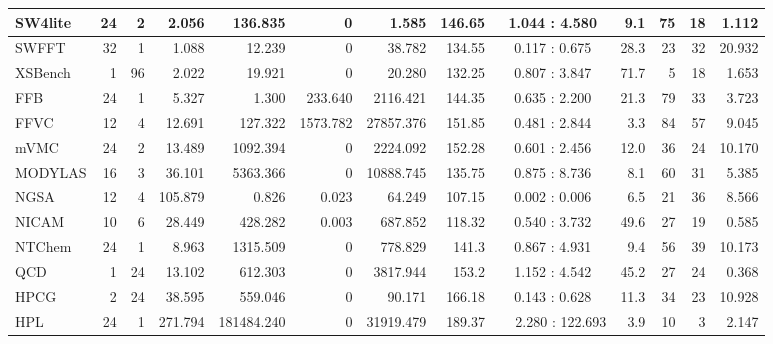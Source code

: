 \begin{table*}[tbp]
\begin{tabular}{|l|r|r|r|r|r|r|r|c|r|r|r|r|}
        SW4lite	    &	24	&	2	&	2.056	&	136.835	&	0	&	1.585	&	146.65	&	1.044 : 4.580	&	9.1		&	75		&    18	&	1.112	\\ \hline
        SWFFT	    &	32	&	1	&	1.088	&	12.239	&	0	&	38.782	&	134.55	&	0.117 : 0.675	&	28.3	&	23		&    32	&	20.932	\\ \hline \rC
        XSBench	    &	1	&	96	&	2.022	&	19.921	&	0	&	20.280	&	132.25	&	0.807 : 3.847	&	71.7	&	5		&    18	&	1.653	\\ \hline\hline
        FFB	        &	24	&	1	&	5.327	&	1.300	&	233.640	&	2116.421	&	144.35	&	0.635 : 2.200	&	21.3	&	79		&    33	&	3.723	\\ \hline \rC
        FFVC	    &	12	&	4	&	12.691	&	127.322	&	1573.782	&	27857.376	&	151.85	&	0.481 : 2.844	&	3.3		&	84		&    57	&	9.045	\\ \hline
        mVMC	    &	24	&	2	&	13.489	&	1092.394	&	0	&	2224.092	&	152.28	&	0.601 : 2.456	&	12.0	&	36		&    24	&	10.170	\\ \hline \rC
        MODYLAS	    &	16	&	3	&	36.101	&	5363.366	&	0	&	10888.745	&	135.75	&	0.875 : 8.736	&	8.1		&	60		&    31	&	5.385	\\ \hline
        NGSA	    &	12	&	4	&	105.879	&	0.826	&	0.023	&	64.249	&	107.15	&	0.002 : 0.006	&	6.5		&	21		&    36	&	8.566	\\ \hline \rC
        NICAM	    &	10	&	6	&	28.449	&	428.282	&	0.003	&	687.852	&	118.32	&	0.540 : 3.732	&	49.6	&	27		&    19	&	0.585	\\ \hline
        NTChem	    &	24	&	1	&	8.963	&	1315.509	&	0	&	778.829	&	141.3	&	0.867 : 4.931	&	9.4		&	56		&    39	&	10.173	\\ \hline \rC
        QCD	        &	1	&	24	&	13.102	&	612.303	&	0	&	3817.944	&	153.2	&	1.152 : 4.542	&	45.2	&	27		&    24	&	0.368	\\ \hline\hline
        HPCG	    &	2	&	24	&	38.595	&	559.046	&	0	&	90.171	&	166.18	&	0.143 : 0.628	&	11.3	&	34		&    23		&	10.928	\\ \hline \rC
        HPL	        &	24	&	1	&	271.794	&	181484.240	&	0	&	31919.479	&	189.37	&	\,~~2.280 : 122.693	&	3.9		&	10		&    3    	&	2.147	\\ \hline
    \end{tabular}
\end{table*}
